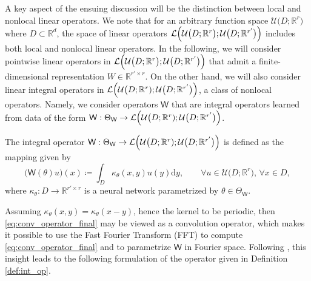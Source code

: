 \documentclass[twoside]{article}
\newcommand{\1}{\mathbbm{1}}
\newcommand{\R}{\mathbbm{R}}
\newcommand{\cU}{\mathcal{U}}
\newcommand{\cL}{\mathcal{L}}
\newcommand{\sW}{\mathsf{W}}
\providecommand{\mathbbm}{\mathbb} %
\begin{document}
A key aspect of the ensuing discussion will be the distinction between local and nonlocal linear operators. We note that for an arbitrary function space $\cU\bigl(D; \R^r\bigr)$ where $D \subset \R^d$, the space of linear operators $\cL\Bigl(\cU\bigl(D; \R^r\bigr) ; \cU\bigl(D; \R^{r'}\bigr) \Bigr)$ includes both local and nonlocal linear operators. In the following, we will consider pointwise linear operators in $\cL\Bigl(\cU\bigl(D; \R^r\bigr) ; \cU\bigl(D; \R^{r'}\bigr) \Bigr)$ that admit a finite-dimensional representation $W\in \R^{r'\times r}$. On the other hand, we will also consider linear integral operators in $\cL\Bigl(\cU\bigl(D;\R^r) ; \cU\bigl(D; \R^{r'}\bigr) \Bigr)$, a class of nonlocal operators. Namely, we consider operators $\sW$ that are integral operators learned from data of the form $\sW:\Theta_{\sW}\to \cL\Bigl(\cU\bigl(D;\R^r) ; \cU\bigl(D; \R^{r'}\bigr) \Bigr)$.

\begin{definition}[Integral Operator $\sW$]
\label{def:int_op}
The integral operator $\sW:\Theta_{\sW}\to \cL\Bigl(\cU\bigl(D;\R^r) ; \cU\bigl(D; \R^{r'}\bigr) \Bigr)$ is defined as the mapping given by
\begin{equation}
\label{eq:conv_operator_final}
    \bigl(\sW(\theta){u} \bigr)(x) \coloneqq \int_{D} {\kappa_\theta}(x,y){u}(y) \mathrm{d}y, \qquad \forall u\in \cU\bigl(D;\R^r),\, \forall x\in D, 
\end{equation}
where ${\kappa}_\theta:D\to \R^{{r'}\times r}$ is a neural network parametrized by $\theta \in \Theta_{\sW}$.
\end{definition}
Assuming ${\kappa}_\theta(x,y) = {\kappa}_\theta(x-y)$, hence the kernel to be periodic, then \eqref{eq:conv_operator_final} may be viewed as a convolution operator, which makes it possible to use the Fast Fourier Transform (FFT) to compute \eqref{eq:conv_operator_final} and to parametrize $\sW$ in Fourier space. Following \citet{li2021fourier}, this insight leads to the following formulation of the operator given in Definition \ref{def:int_op}.
\end{document}
